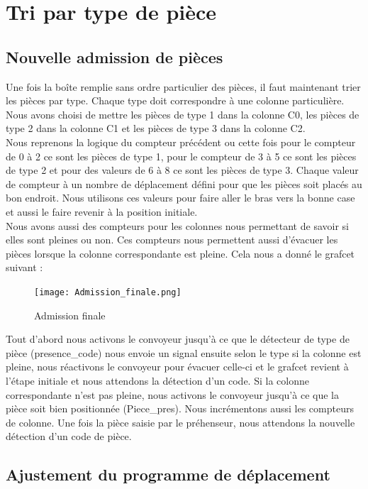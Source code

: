 \documentclass[oneside,a4paper,12pt]{article}
\begin{document}
	\section{Tri par type de pièce}
		\subsection{Nouvelle admission de pièces}
		
		Une fois la boîte remplie sans ordre particulier des pièces, il faut maintenant trier les pièces par type. Chaque type doit correspondre à une colonne particulière. Nous avons choisi de mettre les pièces de type 1 dans la colonne C0, les pièces de type 2 dans la colonne C1 et les pièces de type 3 dans la colonne C2. \\
		Nous reprenons la logique du compteur précédent ou cette fois pour le compteur de 0 à 2 ce sont les pièces de type 1, pour le compteur de 3 à 5 ce sont les pièces de type 2 et pour des valeurs de 6 à 8 ce sont les pièces de type 3. Chaque valeur de compteur à un nombre de déplacement défini pour que les pièces soit placés au bon endroit. Nous utilisons ces valeurs pour faire aller le bras vers la bonne case et aussi le faire revenir à la position initiale. \\
		Nous avons aussi des compteurs pour les colonnes nous permettant de savoir si elles sont pleines ou non. Ces compteurs nous permettent aussi d’évacuer les pièces lorsque la colonne correspondante est pleine. 
		Cela nous a donné le grafcet suivant :\newpage
		
		\begin{figure}[h]
			\centering
			\texttt{[image: Admission\_finale.png]}
			\caption{Admission finale}
		\end{figure}
		
		Tout d’abord nous activons le convoyeur jusqu’à ce que le détecteur de type de pièce (presence\_code) nous envoie un signal ensuite selon le type si la colonne est pleine, nous réactivons le convoyeur pour évacuer celle-ci et le grafcet revient à l’étape initiale et nous attendons la détection d’un code. Si la colonne correspondante n’est pas pleine, nous activons le convoyeur jusqu’à ce que la pièce soit bien positionnée (Piece\_pres). Nous incrémentons aussi les compteurs de colonne. Une fois la pièce saisie par le préhenseur, nous attendons la nouvelle détection d’un code de pièce.
		
		\subsection{Ajustement du programme de déplacement}
		
\end{document}
